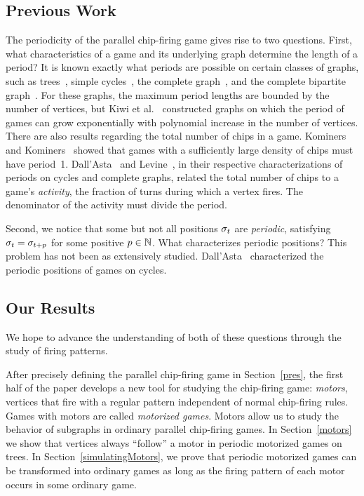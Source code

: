 \subsection*{Previous Work}
The periodicity of the parallel chip-firing game gives rise to two
questions. First, what characteristics of a game and its underlying graph
determine the length of a period? It is known exactly what periods are possible
on certain classes of graphs, such as trees~\cite{bitarGoles}, simple
cycles~\cite{cycle}, the complete graph~\cite{levine}, and the complete
bipartite graph~\cite{jiang}. For these graphs, the maximum period lengths are
bounded by the number of vertices, but Kiwi et al.~\cite{kiwiEtAl} constructed
graphs on which the period of games can grow exponentially with polynomial
increase in the number of vertices. There are also results regarding the total
number of chips in a game. Kominers and Kominers~\cite{kominers} showed that
games with a sufficiently large density of chips must have
period~1. Dall'Asta~\cite{cycle} and Levine~\cite{levine}, in their respective
characterizations of periods on cycles and complete graphs, related the total
number of chips to a game's \emph{activity}, the fraction of turns during which
a vertex fires. The denominator of the activity must divide the period.

Second, we notice that some but not all positions $\sigma_{t}$ are
\emph{periodic}, satisfying $\sigma_{t} = \sigma_{t+p}$ for some positive $p \in
\mathbb{N}$. What characterizes periodic positions? This problem has not been as
extensively studied. Dall'Asta~\cite{cycle} characterized the periodic
positions of games on cycles.

\subsection*{Our Results}
We hope to advance the understanding of both of these questions through the
study of firing patterns.

After precisely defining the parallel chip-firing game in Section~\ref{pres},
the first half of the paper develops a new tool for studying the chip-firing
game: \emph{motors}, vertices that fire with a regular pattern independent of
normal chip-firing rules. Games with motors are called \emph{motorized
  games}. Motors allow us to study the behavior of subgraphs in ordinary
parallel chip-firing games. In Section~\ref{motors} we show that vertices
always ``follow'' a motor in periodic motorized games on trees. In
Section~\ref{simulatingMotors}, we prove that periodic motorized games can be
transformed into ordinary games as long as the firing pattern of each motor
occurs in some ordinary game.

